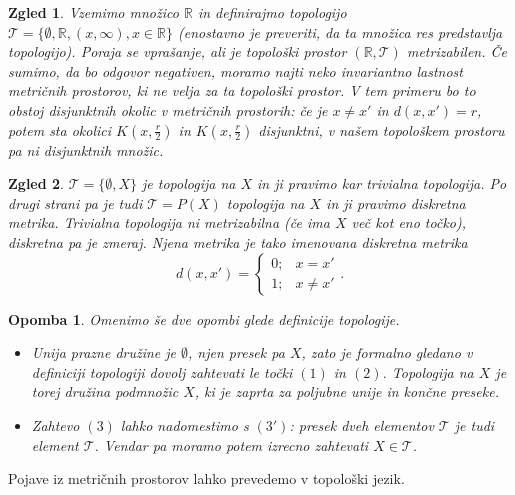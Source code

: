 \documentclass[10pt, a4paper]{article}
\newtheorem*{opomba}{Opomba}
\newtheorem{zgled}{Zgled}[section]
\newcommand{\R}{\mathbb {R}}
\begin{document}
\begin{zgled}
  Vzemimo množico $\R$ in definirajmo topologijo $\mathcal{T} = \{\emptyset, \R, (x, \infty), x\in \R\}$
    (enostavno je preveriti, da ta množica res predstavlja topologijo).
    Poraja se vprašanje, ali je topološki prostor $(\R, \mathcal{T})$ metrizabilen.
    Če sumimo, da bo odgovor negativen, moramo najti neko invariantno lastnost metričnih prostorov, ki ne velja za ta topološki prostor.
    V tem primeru bo to obstoj disjunktnih okolic v metričnih prostorih: če je $x \neq x'$ in $d(x, x') = r$,
    potem sta okolici $K\left(x, \frac{r}{2}\right)$ in $K\left(x, \frac{r}{2}\right)$ disjunktni, v našem topološkem prostoru pa ni disjunktnih množic.
\end{zgled}

\begin{zgled}
    $\mathcal{T} = \{\emptyset, X\}$ je topologija na $X$ in ji pravimo kar trivialna topologija.
    Po drugi strani pa je tudi $\mathcal{T} = P(X)$ topologija na $X$ in ji pravimo diskretna metrika.
    Trivialna topologija ni metrizabilna (če ima $X$ več kot eno točko), diskretna pa je zmeraj.
    Njena metrika je tako imenovana diskretna metrika $$d(x, x') = \begin{cases}
      0 ;& x = x'\\
      1 ;& x \neq x'
    \end{cases}.$$
\end{zgled}

\begin{opomba}
  Omenimo še dve opombi glede definicije topologije.
  \begin{itemize}
    \item Unija prazne družine je $\emptyset$, njen presek pa $X$,
    zato je formalno gledano v definiciji topologiji dovolj zahtevati le točki $(1)$ in $(2)$.
    Topologija na $X$ je torej družina podmnožic $X$, ki je zaprta za poljubne unije in končne preseke.
    \item Zahtevo $(3)$ lahko nadomestimo s $(3')$: presek dveh elementov $\mathcal{T}$ je tudi element $\mathcal{T}$.
    Vendar pa moramo potem izrecno zahtevati $X \in \mathcal{T}$.
  \end{itemize}
\end{opomba}

Pojave iz metričnih prostorov lahko prevedemo v topološki jezik.
\end{document}
